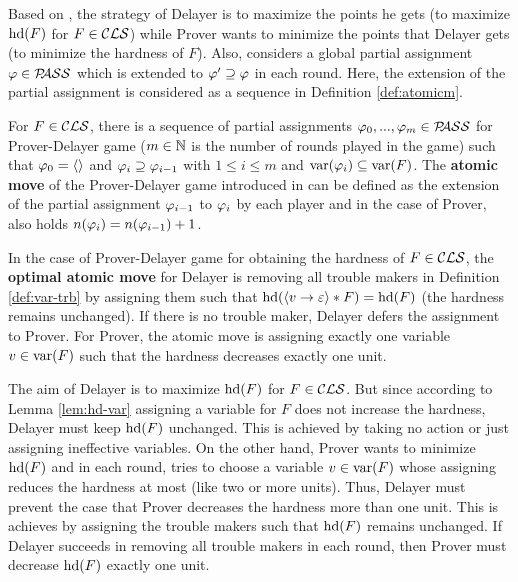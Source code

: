 \documentclass{report}
\begin{document}
Based on \cite{BeyersdorffKullmann2014PHP}, the strategy of Delayer is to maximize the points he gets (to maximize $\operatorname{hd}(F)$ for $F \in \mathcal{CLS}$) while Prover wants to minimize the points that Delayer gets (to minimize the hardness of $F$). Also, \cite{BeyersdorffKullmann2014PHP} considers a global partial assignment $\varphi \in \mathcal{P\hspace{-0.32em}ASS}$ which is extended to $\varphi' \supseteq \varphi$ in each round. Here, the extension of the partial assignment is considered as a sequence in Definition \ref{def:atomicm}.

\begin{defi}\label{def:atomicm}
For $F \in \mathcal{CLS}$, there is a sequence of partial assignments $\varphi_0, ..., \varphi_m \in \mathcal{P\hspace{-0.32em}ASS}$ for Prover-Delayer game ($m \in \mathbb{N}$ is the number of rounds played in the game) such that $\varphi_0=\langle  \rangle$ and $\varphi_i \supseteq \varphi_{i-1}$ with $1 \le i \le m$ and $\operatorname{var}(\varphi_i) \subseteq \operatorname{var}(F)$. The \textbf{atomic move} of the Prover-Delayer game introduced in \cite{BeyersdorffKullmann2014PHP} can be defined as the extension of the partial assignment $\varphi_{i-1} $ to $\varphi_{i}$ by each player and in the case of Prover, also holds $n(\varphi_i)=n( \varphi_{i-1})+1$.
\end{defi}

\begin{lem}\label{lem:atm-m-D-P}
In the case of Prover-Delayer game for obtaining the hardness of $F \in \mathcal{CLS}$, the \textbf{optimal atomic move} for Delayer is removing all trouble makers in Definition \ref{def:var-trb} by assigning them such that $\operatorname{hd}(\langle v \rightarrow \varepsilon \rangle*F)=\operatorname{hd}(F)$ (the hardness remains unchanged). If there is no trouble maker, Delayer defers the assignment to Prover. For Prover, the atomic move is assigning exactly one variable $v \in \operatorname{var}(F)$ such that the hardness decreases exactly one unit.
\end{lem}
\begin{prf}
The aim of Delayer is to maximize $\operatorname{hd}(F)$ for $F \in \mathcal{CLS}$. But since according to Lemma \ref{lem:hd-var} assigning a variable for $F$ does not increase the hardness, Delayer must keep $\operatorname{hd}(F)$ unchanged. This is achieved by taking no action or just assigning  ineffective variables. On the other hand, Prover wants to minimize $\operatorname{hd}(F)$ and in each round, tries to choose a variable $v \in \operatorname{var}(F)$ whose assigning reduces the hardness at most (like two or more units). Thus, Delayer must prevent the case that Prover decreases the hardness more than one unit. This is achieves by assigning the trouble makers such that $\operatorname{hd}(F)$ remains unchanged. If Delayer succeeds in removing all trouble makers in each round, then Prover must decrease $\operatorname{hd}(F)$ exactly one unit.
\end{prf}
\end{document}
